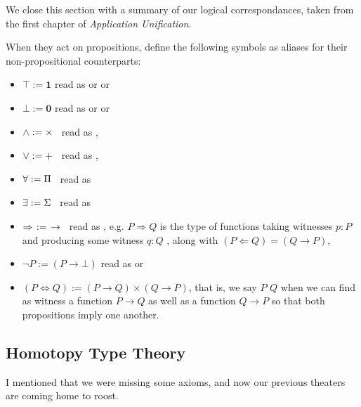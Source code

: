 \documentclass[11pt]{article}
\begin{document}
We close this section with a summary of our logical correspondances, taken from the first chapter of \emph{Application Unification}.

\begin{notation}
When they act on propositions, define the following symbols as aliases for their non-propositional counterparts:
\begin{itemize}
\item $\top := \mathbf{1}$ read as  or  or 
\item $\bot := \mathbf{0}$ read as  or  or 
\item $\wedge := \times \hspace{0.5em}$ read as ,
\item $\vee := + \hspace{0.5em}$ read as ,
\item $\forall := \Pi\hspace{0.5em}$ read as  
\item $\exists := \Sigma\hspace{0.5em}$ read as  
\item $\Rightarrow \hspace{4pt} := \hspace{4pt} \to \hspace{0.5em}$ read as , e.g. $P \Rightarrow Q$ is the type of functions taking witnesses $p \colon P$ and producing some witness $q \colon Q$ , along with $(P \Leftarrow Q) = (Q \rightarrow P)$,
\item $\neg P := (P \to \bot)$ read as  or 
\item $(P \Leftrightarrow Q) := (P \to Q) \times (Q \to P)$, that is, we say $P$  $Q$ when we can find as witness a function $P \to Q$ as well as a function $Q \to P$ so that both propositions imply one another.
\end{itemize}
\end{notation}

\subsection{Homotopy Type Theory}

I mentioned that we were missing some axioms, and now our previous theaters are coming home to roost.
\end{document}
